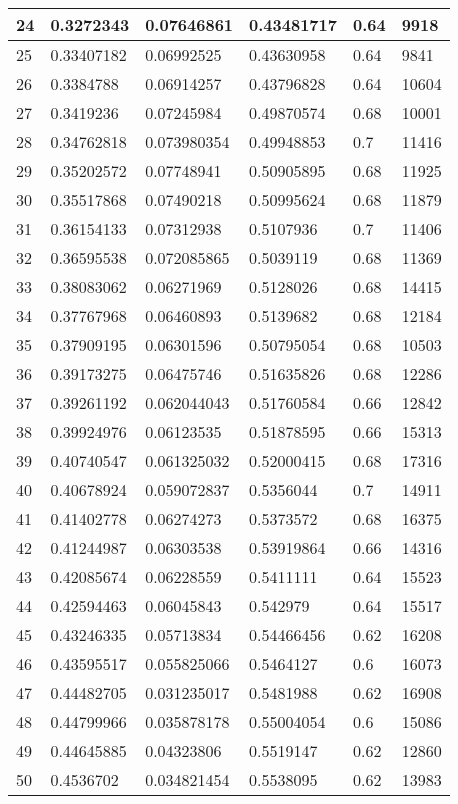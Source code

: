 \begin{longtable}{|l|l|l|l|l|l|}
24 & 0.3272343 & 0.07646861 & 0.43481717 & 0.64 & 9918 \\ \hline 
25 & 0.33407182 & 0.06992525 & 0.43630958 & 0.64 & 9841 \\ \hline 
26 & 0.3384788 & 0.06914257 & 0.43796828 & 0.64 & 10604 \\ \hline 
27 & 0.3419236 & 0.07245984 & 0.49870574 & 0.68 & 10001 \\ \hline 
28 & 0.34762818 & 0.073980354 & 0.49948853 & 0.7 & 11416 \\ \hline 
29 & 0.35202572 & 0.07748941 & 0.50905895 & 0.68 & 11925 \\ \hline 
30 & 0.35517868 & 0.07490218 & 0.50995624 & 0.68 & 11879 \\ \hline 
31 & 0.36154133 & 0.07312938 & 0.5107936 & 0.7 & 11406 \\ \hline 
32 & 0.36595538 & 0.072085865 & 0.5039119 & 0.68 & 11369 \\ \hline 
33 & 0.38083062 & 0.06271969 & 0.5128026 & 0.68 & 14415 \\ \hline 
34 & 0.37767968 & 0.06460893 & 0.5139682 & 0.68 & 12184 \\ \hline 
35 & 0.37909195 & 0.06301596 & 0.50795054 & 0.68 & 10503 \\ \hline 
36 & 0.39173275 & 0.06475746 & 0.51635826 & 0.68 & 12286 \\ \hline 
37 & 0.39261192 & 0.062044043 & 0.51760584 & 0.66 & 12842 \\ \hline 
38 & 0.39924976 & 0.06123535 & 0.51878595 & 0.66 & 15313 \\ \hline 
39 & 0.40740547 & 0.061325032 & 0.52000415 & 0.68 & 17316 \\ \hline 
40 & 0.40678924 & 0.059072837 & 0.5356044 & 0.7 & 14911 \\ \hline 
41 & 0.41402778 & 0.06274273 & 0.5373572 & 0.68 & 16375 \\ \hline 
42 & 0.41244987 & 0.06303538 & 0.53919864 & 0.66 & 14316 \\ \hline 
43 & 0.42085674 & 0.06228559 & 0.5411111 & 0.64 & 15523 \\ \hline 
44 & 0.42594463 & 0.06045843 & 0.542979 & 0.64 & 15517 \\ \hline 
45 & 0.43246335 & 0.05713834 & 0.54466456 & 0.62 & 16208 \\ \hline 
46 & 0.43595517 & 0.055825066 & 0.5464127 & 0.6 & 16073 \\ \hline 
47 & 0.44482705 & 0.031235017 & 0.5481988 & 0.62 & 16908 \\ \hline 
48 & 0.44799966 & 0.035878178 & 0.55004054 & 0.6 & 15086 \\ \hline 
49 & 0.44645885 & 0.04323806 & 0.5519147 & 0.62 & 12860 \\ \hline 
50 & 0.4536702 & 0.034821454 & 0.5538095 & 0.62 & 13983 \\ \hline 
\end{longtable}
